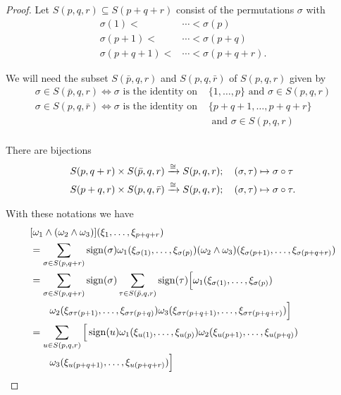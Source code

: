 \begin{proof}
  Let $S(p, q, r)\subseteq S(p+q+r)$ consist of the permutations $\sigma$ with
  \begin{align*}
    \sigma(1) <     & \cdots < \sigma(p)      \\
    \sigma(p+1) <   & \cdots < \sigma(p+q)    \\
    \sigma(p+q+1) < & \cdots < \sigma(p+q+r).
  \end{align*}

  We will need the subset $S(\bar{p}, q, r)$ and $S(p, q, \bar{r})$ of $S(p, q, r)$ given by
  \begin{align*}
  \sigma \in S(\bar{p}, q, r) \Longleftrightarrow \sigma \text{ is the identity on }  & \{1, \ldots, p\} \text{ and } \sigma\in S(p, q, r) \\
  \sigma \in S(p, q, \bar{r}) \Longleftrightarrow \sigma \text{ is the identity on }  & \{p+q+1, \ldots, p+q+r\}                           \\
                                                                                      & \text{ and } \sigma\in S(p, q, r)                  \\
  \end{align*}

  There are bijections
  \begin{align}\label{eq:2-2}
    \begin{aligned}
      S(p, q+r) \times S(\bar{p}, q, r)         & \xra[\cong] S(p, q, r); \quad (\sigma, \tau)\mapsto\sigma\circ\tau   \\
      S(p+q, r) \times S(p, q, \bar{r}) & \xra[\cong] S(p, q, r); \quad (\sigma, \tau)\mapsto\sigma\circ\tau.
    \end{aligned}
  \end{align}

  With these notations we have
  \begin{align*}
    & [\omega_1\wedge(\omega_2\wedge\omega_3)](\xi_1,\ldots,\xi_{p+q+r})                                                                              \\
    & = \sum_{\sigma\in S(p,q+r)}\operatorname{sign}(\sigma)\omega_1(\xi_{\sigma(1)},\ldots,\xi_{\sigma(p)})
    (\omega_2\wedge\omega_3)(\xi_{\sigma(p+1)},\ldots,\xi_{\sigma(p+q+r)})                                                                             \\
    & = \sum_{\sigma\in S(p,q+r)}\operatorname{sign}(\sigma)\sum_{\tau\in S(\bar{p},q,r)}\operatorname{sign}(\tau)\Big[\omega_1(\xi_{\sigma(1)},\ldots,\xi_{\sigma(p)})               \\
    & \hspace*{2em} \omega_2(\xi_{\sigma\tau(p+1)},\ldots,\xi_{\sigma\tau(p+q)})\omega_3(\xi_{\sigma\tau(p+q+1)},\ldots,\xi_{\sigma\tau(p+q+r)})\Big] \\
    & = \sum_{u\in S(p,q,r)}\Big[\operatorname{sign}(u)\omega_1(\xi_{u(1)},\ldots,\xi_{u(p)})\omega_2(\xi_{u(p+1)},\ldots,\xi_{u(p+q)})                             \\
    & \hspace*{2em} \omega_3(\xi_{u(p+q+1)},\ldots,\xi_{u(p+q+r)})\Big]
  \end{align*}


\end{proof}
